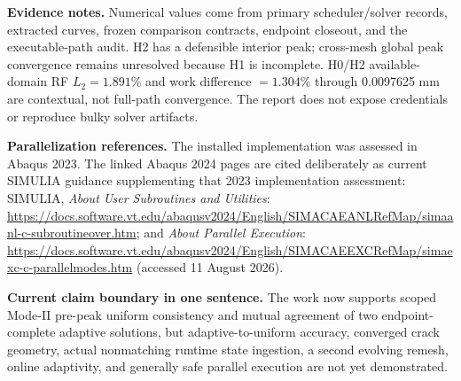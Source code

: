 \documentclass[11pt,a4paper]{article}
\newcommand{\boxx}[2]{\colorbox{#1}{\parbox{\dimexpr\linewidth-2\fboxsep}{#2}}}
\begin{document}
\textbf{Evidence notes.} Numerical values come from primary scheduler/solver records, extracted curves, frozen comparison contracts, endpoint closeout, and the executable-path audit. H2 has a defensible interior peak; cross-mesh global peak convergence remains unresolved because H1 is incomplete. H0/H2 available-domain RF $L_2=1.891\%$ and work difference $=1.304\%$ through 0.0097625 mm are contextual, not full-path convergence. The report does not expose credentials or reproduce bulky solver artifacts.

\textbf{Parallelization references.} The installed implementation was assessed in Abaqus 2023. The linked Abaqus 2024 pages are cited deliberately as current SIMULIA guidance supplementing that 2023 implementation assessment: SIMULIA, \emph{About User Subroutines and Utilities}: \url{https://docs.software.vt.edu/abaqusv2024/English/SIMACAEANLRefMap/simaanl-c-subroutineover.htm}; and \emph{About Parallel Execution}: \url{https://docs.software.vt.edu/abaqusv2024/English/SIMACAEEXCRefMap/simaexc-c-parallelmodes.htm} (accessed 11 August 2026).

\vfill
\boxx{pb}{\textbf{Current claim boundary in one sentence.} The work now supports scoped Mode-II pre-peak uniform consistency and mutual agreement of two endpoint-complete adaptive solutions, but adaptive-to-uniform accuracy, converged crack geometry, actual nonmatching runtime state ingestion, a second evolving remesh, online adaptivity, and generally safe parallel execution are not yet demonstrated.}
\end{document}
